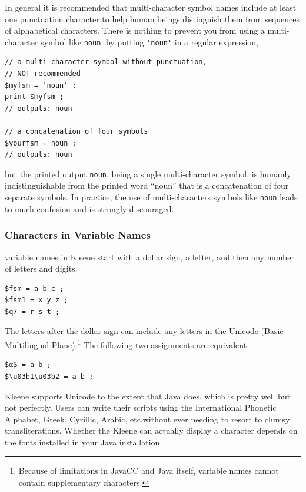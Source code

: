 In general it is recommended that multi-character symbol names include at least
one punctuation character to help human beings distinguish them from sequences of
alphabetical characters.  There is nothing to prevent you from using a
multi-character symbol like \texttt{noun}, by putting \verb!'noun'! in a regular
expression,


\begin{Verbatim}
// a multi-character symbol without punctuation, 
// NOT recommended
$myfsm = 'noun' ;
print $myfsm ;
// outputs: noun

// a concatenation of four symbols
$yourfsm = noun ;
// outputs: noun
\end{Verbatim}

\noindent
but the printed output \texttt{noun}, being a single multi-character symbol,
is humanly indistinguishable from the printed word ``noun''
that is a concatenation of four separate symbols.  In practice, the use of
multi-characters symbols like \verb'noun' leads to much confusion and is
strongly discouraged.  

\subsubsection{Characters in Variable Names}

\fsm{} variable names in Kleene start with a dollar sign, a letter, and then any number of
letters and digits.


\begin{Verbatim}
$fsm = a b c ;
$fsm1 = x y z ;
$q7 = r s t ;
\end{Verbatim}

\noindent
The letters after the dollar sign can include any letters in the Unicode  (Basic
Multilingual Plane).\footnote{Because of limitations in JavaCC and Java itself, variable
names cannot contain supplementary characters.}  The following two assignments are equivalent 


\begin{Verbatim}
$αβ = a b ;
$\u03b1\u03b2 = a b ;
\end{Verbatim}

Kleene supports Unicode to the extent that Java does, which is pretty well but not
perfectly.  Users can write their scripts using the International Phonetic Alphabet, Greek,
Cyrillic, Arabic, etc.\@ without ever needing to resort to clumsy transliterations.
Whether the Kleene \gui{} can actually display a character depends on the fonts installed in
your Java installation.

